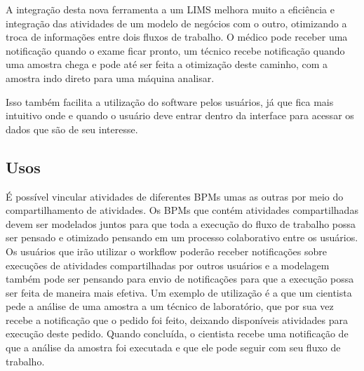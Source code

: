 
A integração desta nova ferramenta a um LIMS melhora muito a eficiência e integração das atividades de um modelo de negócios com o outro, otimizando a troca de informações entre dois fluxos de trabalho. O médico pode receber uma notificação quando o exame ficar pronto, um técnico recebe notificação quando uma amostra chega e pode até ser feita a otimização deste caminho, com a amostra indo direto para uma máquina analisar.

Isso também facilita a utilização do software pelos usuários, já que fica mais intuitivo onde e quando o usuário deve entrar dentro da interface para acessar os dados que são de seu interesse.


\subsection{Usos}

É possível vincular atividades de diferentes BPMs umas as outras por meio do compartilhamento de atividades. Os BPMs que contém atividades compartilhadas devem ser modelados juntos para que toda a execução do fluxo de trabalho possa ser pensado e otimizado pensando em um processo colaborativo entre os usuários. Os usuários que irão utilizar o workflow poderão receber notificações sobre execuções de atividades compartilhadas por outros usuários e a modelagem também pode ser pensando para envio de notificações para que a execução possa ser feita de maneira mais efetiva. Um exemplo de utilização é a que um cientista pede a análise de uma amostra a um técnico de laboratório, que por sua vez recebe a notificação que o pedido foi feito, deixando disponíveis atividades para execução deste pedido. Quando concluída, o cientista recebe uma notificação de que a análise da amostra foi executada e que ele pode seguir com seu fluxo de trabalho.